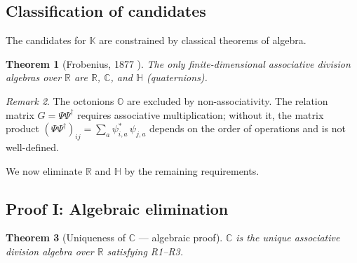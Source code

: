 \documentclass[12pt]{article}
\newtheorem{theorem}{Theorem}[section]
\theoremstyle{remark}
\newtheorem{remark}[theorem]{Remark}
\theoremstyle{definition}
\begin{document}
\subsection{Classification of candidates}

The candidates for $\mathbb{K}$ are constrained by classical theorems of algebra.

\begin{theorem}[Frobenius, 1877 \cite{Frobenius}]
The only finite-dimensional associative division algebras over $\mathbb{R}$ are $\mathbb{R}$, $\mathbb{C}$, and $\mathbb{H}$ (quaternions).
\end{theorem}

\begin{remark}
The octonions $\mathbb{O}$ are excluded by non-associativity. The relation matrix $G = \Psi\Psi^\dagger$ requires associative multiplication; without it, the matrix product $(\Psi\Psi^\dagger)_{ij} = \sum_a \psi^*_{i,a}\,\psi_{j,a}$ depends on the order of operations and is not well-defined.
\end{remark}

We now eliminate $\mathbb{R}$ and $\mathbb{H}$ by the remaining requirements.

\subsection{Proof I: Algebraic elimination}

\begin{theorem}[Uniqueness of $\mathbb{C}$ --- algebraic proof]
\label{thm:C_algebra}
$\mathbb{C}$ is the unique associative division algebra over $\mathbb{R}$ satisfying R1--R3.
\end{theorem}
\end{document}
